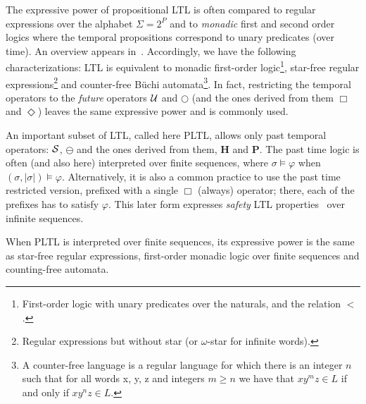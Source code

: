 The expressive power of propositional LTL is often compared to regular expressions
over the alphabet $\Sigma = 2^P$ and to  {\em monadic} first and second order logics where the temporal propositions
correspond to unary predicates (over time). An overview appears in~\cite{Thomas}. Accordingly, we have the following characterizations:
LTL is equivalent to monadic first-order logic\footnote{First-order logic with unary predicates over the naturals, and the relation $<$.},  star-free regular expressions\footnote{Regular expressions but without star (or $\omega$-star for infinite words).} and counter-free B\"{u}chi automata\footnote{A counter-free language is a regular language for which there is an integer $n$ such that for all words x, y, z and integers $m \geq n$ we have that $xy^m z \in L$ if and only if $xy^n z \in L$.}. In fact, restricting the temporal operators to the {\em future}  operators $\mathbin{\mathcal{U}}$ and $\bigcirc$
(and the ones derived from them $\Box$ and $\Diamond$)
leaves the same expressive power and is commonly used. 


An important subset of LTL, called here PLTL, allows only past temporal
operators: ${\cal S}$, $\ominus$ and the ones derived
from them, $\mathbf{H}$ and $\mathbf{P}$. The past time logic is often
(and also here) interpreted over finite sequences, 
where $\sigma \models \varphi$ when $( \sigma , | \sigma | ) \models \varphi$.
Alternatively,
it is also a common practice to use the past time restricted version, prefixed with  a single $\Box$ (always) operator; there, each of the prefixes has to satisfy $\varphi$. This later
form expresses {\em safety} LTL properties~\cite{AS} over infinite sequences. 



When PLTL is interpreted over finite sequences, its
expressive power is the same as star-free regular expressions, first-order monadic logic over finite sequences and counting-free automata.


\label{sec:extending-prop-ltl}



